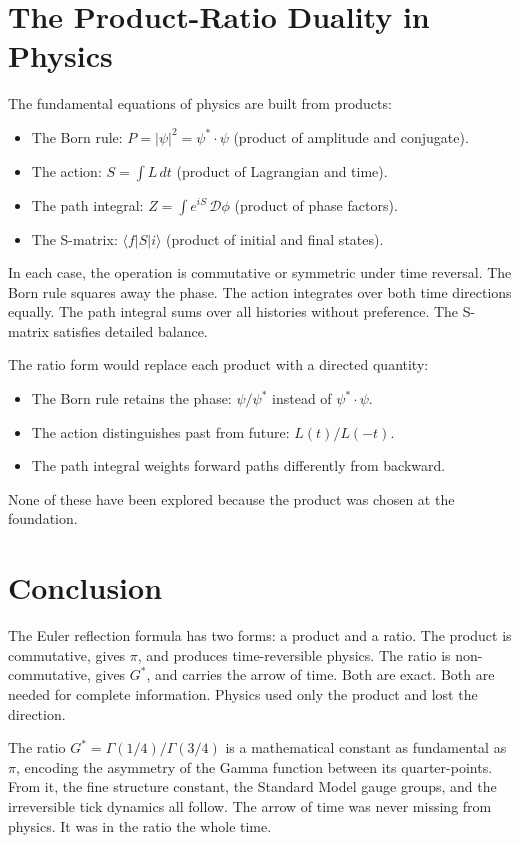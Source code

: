 \documentclass[12pt,letterpaper]{article}
\begin{document}
\section{The Product-Ratio Duality in Physics}

The fundamental equations of physics are built from products:
\begin{itemize}
\item The Born rule: $P = |\psi|^2 = \psi^* \cdot \psi$ (product of amplitude and conjugate).
\item The action: $S = \int L\,dt$ (product of Lagrangian and time).
\item The path integral: $Z = \int e^{iS}\,\mathcal{D}\phi$ (product of phase factors).
\item The S-matrix: $\langle f|S|i\rangle$ (product of initial and final states).
\end{itemize}
In each case, the operation is commutative or symmetric under time reversal. The Born rule squares away the phase. The action integrates over both time directions equally. The path integral sums over all histories without preference. The S-matrix satisfies detailed balance.

The ratio form would replace each product with a directed quantity:
\begin{itemize}
\item The Born rule retains the phase: $\psi/\psi^*$ instead of $\psi^* \cdot \psi$.
\item The action distinguishes past from future: $L(t)/L(-t)$.
\item The path integral weights forward paths differently from backward.
\end{itemize}
None of these have been explored because the product was chosen at the foundation.

\section{Conclusion}

The Euler reflection formula has two forms: a product and a ratio. The product is commutative, gives $\pi$, and produces time-reversible physics. The ratio is non-commutative, gives $G^*$, and carries the arrow of time. Both are exact. Both are needed for complete information. Physics used only the product and lost the direction.

The ratio $G^* = \Gamma(1/4)/\Gamma(3/4)$ is a mathematical constant as fundamental as $\pi$, encoding the asymmetry of the Gamma function between its quarter-points. From it, the fine structure constant, the Standard Model gauge groups, and the irreversible tick dynamics all follow. The arrow of time was never missing from physics. It was in the ratio the whole time.
\end{document}
